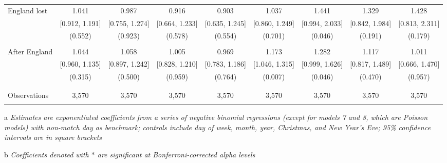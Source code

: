 \documentclass[12pt, a4paper]{article}
\begin{document}
\begin{table}
\begin{threeparttable}
\begin{tabular}{@{\extracolsep{1pt}}lcccccccc}
 England lost & 1.041 & 0.987 & 0.916 & 0.903 & 1.037 & 1.441 & 1.329 & 1.428 \\ 
  & [0.912, 1.191] & [0.755, 1.274] & [0.664, 1.233] & [0.635, 1.245] & [0.860, 1.249] & [0.994, 2.033] & [0.842, 1.984] & [0.813, 2.311] \\ 
  & (0.552) & (0.923) & (0.578) & (0.554) & (0.701) & (0.046) & (0.191) & (0.179) \\ 
  & & & & & & & & \\ 
 After England & 1.044 & 1.058 & 1.005 & 0.969 & 1.173 & 1.282 & 1.117 & 1.011 \\ 
  & [0.960, 1.135] & [0.897, 1.242] & [0.828, 1.210] & [0.783, 1.186] & [1.046, 1.315] & [0.999, 1.626] & [0.817, 1.489] & [0.666, 1.470] \\ 
  & (0.315) & (0.500) & (0.959) & (0.764) & (0.007) & (0.046) & (0.470) & (0.957) \\ 
  & & & & & & & & \\ 
\hline \\[-1.8ex] 
Observations & 3,570 & 3,570 & 3,570 & 3,570 & 3,570 & 3,570 & 3,570 & 3,570 \\ 
\hline 
\hline \\[-1.8ex] 
\end{tabular} 
\begin{tablenotes}
      \item[a] \textit{Estimates are exponentiated coefficients from a series of negative binomial regressions (except for models 7 and 8, which are Poisson models) with non-match day as benchmark; controls include day of week, month, year, Christmas, and New Year's Eve; 95\% confidence intervals are in square brackets}
             \item[b] \textit{Coefficients denoted with $*$ are significant at Bonferroni-corrected alpha levels}
    \end{tablenotes}
\end{threeparttable} 
\end{table}
\end{document}
